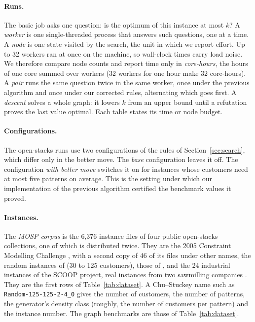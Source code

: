 \paragraph{Runs.} The basic job asks one question: is the optimum of this
instance at most $k$? A \emph{worker} is one single-threaded process that
answers such questions, one at a time. A \emph{node} is one state visited by
the search, the unit in which we report effort. Up to 32 workers ran at
once on the machine, so wall-clock times carry load noise. We therefore
compare node counts and report time only in \emph{core-hours}, the hours of one core summed over workers (32 workers for one hour make 32 core-hours). A \emph{pair} runs
the same question twice in the same worker, once under the previous algorithm
and once under our corrected rules, alternating which goes first. A
\emph{descent} solves a whole graph: it lowers $k$ from an upper bound until a
refutation proves the last value optimal. Each table states its time or node
budget.

\paragraph{Configurations.} The open-stacks runs use two configurations of the
rules of Section~\ref{sec:search}, which differ only in the better move. The
\emph{base} configuration leaves it off. The configuration \emph{with better
move} switches it on for instances whose customers need at most five patterns on
average. This is the setting under which our implementation of the previous algorithm certified the benchmark values it proved.

\paragraph{Instances.} The \emph{MOSP corpus} is the 6,376 instance files of
four public open-stacks collections, one of which is distributed twice. They
are the 2005 Constraint Modelling Challenge \citep{SmithGent2005}, with a
second copy of 46 of its files under other names, the random
instances of \citet{ChuStuckey2009} (30 to 125 customers), those of
\citet{FaggioliBentivoglio1998}, and the 24 industrial instances of the SCOOP project, real instances from two sawmilling companies \citep{Frinhani2018}. They
are the first rows of Table~\ref{tab:dataset}. A Chu--Stuckey name such as
\texttt{Random-125-125-2-4\_0} gives the number of customers, the number of
patterns, the generator's density class (roughly, the number of customers per pattern) and the instance number. The graph benchmarks are those of Table~\ref{tab:dataset}.

